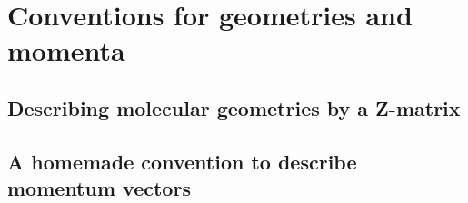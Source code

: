 \section{Conventions for geometries and momenta}

\subsection{Describing molecular geometries by a Z-matrix}

\subsection{A homemade convention to describe momentum vectors}
